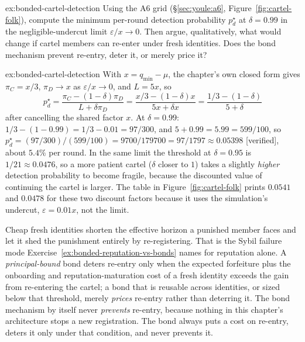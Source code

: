 \documentclass[11pt,a4paper]{article}
\theoremstyle{definition}
\theoremstyle{remark}
\begin{document}
\begin{pdexercise}[kind=Trace,rating=2]{ex:bonded-cartel-detection}
Using the A6 grid (\S\ref{sec:youle:a6}, Figure~\ref{fig:cartel-folk}), compute the minimum per-round detection probability $p_d^\star$ at $\delta = 0.99$ in the negligible-undercut limit $\varepsilon/x \to 0$. Then argue, qualitatively, what would change if cartel members can re-enter under fresh identities. Does the bond mechanism prevent re-entry, deter it, or merely price it?
\end{pdexercise}
\begin{pdsolution}{ex:bonded-cartel-detection}
With $x = q_{\min} - \mu$, the chapter's own closed form gives $\pi_C = x/3$, $\pi_D \to x$ as $\varepsilon/x\to0$, and $L=5x$, so
\[
p_d^\star=\frac{\pi_C-(1-\delta)\pi_D}{L+\delta\pi_D} = \frac{x/3-(1-\delta)x}{5x+\delta x} = \frac{1/3-(1-\delta)}{5+\delta}
\]
after cancelling the shared factor $x$. At $\delta=0.99$: $1/3-(1-0.99)=1/3-0.01=97/300$, and $5+0.99=5.99=599/100$, so $p_d^\star = (97/300)/(599/100) = 9700/179700 = 97/1797 \approx 0.05398$ [verified], about $5.4\%$ per round. In the same limit the threshold at $\delta=0.95$ is $1/21\approx0.0476$, so a more patient cartel ($\delta$ closer to $1$) takes a slightly \emph{higher} detection probability to become fragile, because the discounted value of continuing the cartel is larger. The table in Figure~\ref{fig:cartel-folk} prints $0.0541$ and $0.0478$ for these two discount factors because it uses the simulation's undercut, $\varepsilon=0.01x$, not the limit.

Cheap fresh identities shorten the effective horizon a punished member faces and let it shed the punishment entirely by re-registering. That is the Sybil failure mode Exercise~\ref{ex:bonded-reputation-vs-bonds} names for reputation alone. A \emph{principal-bound} bond deters re-entry only when the expected forfeiture plus the onboarding and reputation-maturation cost of a fresh identity exceeds the gain from re-entering the cartel; a bond that is reusable across identities, or sized below that threshold, merely \emph{prices} re-entry rather than deterring it. The bond mechanism by itself never \emph{prevents} re-entry, because nothing in this chapter's architecture stops a new registration. The bond always puts a cost on re-entry, deters it only under that condition, and never prevents it.
\end{pdsolution}
\end{document}
